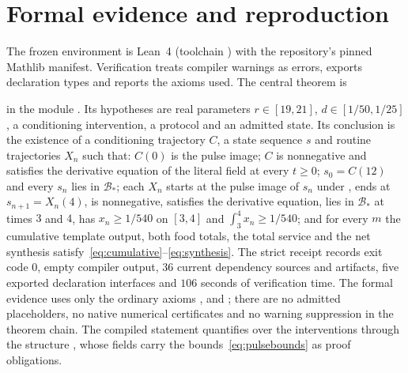 \documentclass[11pt,a4paper]{article}
\theoremstyle{plain}
\theoremstyle{definition}
\theoremstyle{remark}
\newcommand{\Bstar}{\mathcal B_*}
\begin{document}
\section{Formal evidence and reproduction}\label{app:formal}
The frozen environment is Lean~4 (toolchain ) with the repository's pinned Mathlib manifest. Verification treats compiler warnings as errors, exports declaration types and reports the axioms used. The central theorem is
\begin{center}\end{center}
in the module . Its hypotheses are real parameters $r\in[19,21]$, $d\in[1/50,1/25]$, a conditioning intervention, a protocol  and an admitted state. Its conclusion is the existence of a conditioning trajectory $C$, a state sequence $s$ and routine trajectories $X_n$ such that: $C(0)$ is the pulse image; $C$ is nonnegative and satisfies the derivative equation of the literal field at every $t\ge0$; $s_0=C(12)$ and every $s_n$ lies in $\Bstar$; each $X_n$ starts at the pulse image of $s_n$ under , ends at $s_{n+1}=X_n(4)$, is nonnegative, satisfies the derivative equation, lies in $\Bstar$ at times $3$ and $4$, has $x_n\ge1/540$ on $[3,4]$ and $\int_3^4x_n\ge1/540$; and for every $m$ the cumulative template output, both food totals, the total service and the net synthesis satisfy~\eqref{eq:cumulative}--\eqref{eq:synthesis}. The strict receipt records exit code $0$, empty compiler output, $36$ current dependency sources and artifacts, five exported declaration interfaces and $106$ seconds of verification time. The formal evidence uses only the ordinary axioms ,  and ; there are no admitted placeholders, no native numerical certificates and no warning suppression in the theorem chain. The compiled statement quantifies over the interventions through the structure , whose fields carry the bounds~\eqref{eq:pulsebounds} as proof obligations.
\end{document}
